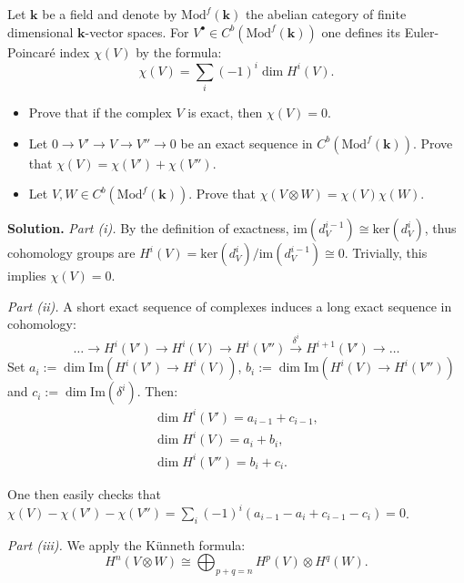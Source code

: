 \documentclass{category-template}
\begin{document}
\begin{problem}
    Let $\mathbf{k}$ be a field and denote by $\text{Mod}^f(\mathbf{k})$ the
    abelian category of finite dimensional $\mathbf{k}$-vector spaces. For
    $V^{\bullet} \in C^b(\text{Mod}^f(\mathbf{k}))$ one defines its 
    Euler-Poincaré index $\chi(V)$ by the formula:
    \begin{equation*}
        \chi(V) = \sum_i (-1)^i\dim H^i(V).
    \end{equation*}
    \begin{itemize}
        \item[(i)] Prove that if the complex $V$ is exact, then $\chi(V)=0$.
        \item[(ii)] Let $0 \to V' \to V \to V'' \to 0$ be an exact sequence in 
        $C^b(\text{Mod}^f(\mathbf{k}))$. Prove that $\chi(V)=\chi(V')+\chi(V'')$.
        \item[(iii)] Let $V,W \in C^b(\text{Mod}^f(\mathbf{k}))$. Prove that
        $\chi(V \otimes W) = \chi(V)\chi(W)$.
    \end{itemize}
\end{problem}

\textbf{Solution.} \textit{Part (i).} By the definition of exactness,
$\text{im}(d_V^{i-1}) \cong \text{ker}(d_V^{i})$, thus cohomology groups are
$H^i(V) = \text{ker}(d_V^i)/\text{im}(d_V^{i-1}) \cong 0$. Trivially, this
implies $\chi(V)=0$.

\textit{Part (ii).} A short exact sequence of complexes induces a long 
exact sequence in cohomology:
\begin{equation*}
    \dots \to H^i(V') \to H^i(V) \to H^i(V'') \xrightarrow{\delta^i} H^{i+1}(V') \to \dots
\end{equation*}
Set $a_i := \dim\text{Im}(H^i(V') \to H^i(V))$, $b_i :=
\dim\text{Im}(H^i(V) \to H^i(V''))$ and $c_i := \dim \text{Im}(\delta^i)$. Then:
\begin{gather*}
    \dim H^i(V') = a_{i-1} + c_{i-1},\\
    \dim H^i(V) = a_i + b_i, \\
    \dim H^i(V'') = b_i + c_i.
\end{gather*}

One then easily checks that $\chi(V) - \chi(V') - \chi(V'') = \sum_i
(-1)^i(a_{i-1}-a_i+c_{i-1}-c_i)=0$.

\textit{Part (iii).} We apply the Künneth formula:
\begin{equation*}
    H^n(V \otimes W) \cong \bigoplus_{p+q=n} H^p(V) \otimes H^q(W).
\end{equation*}
\end{document}
